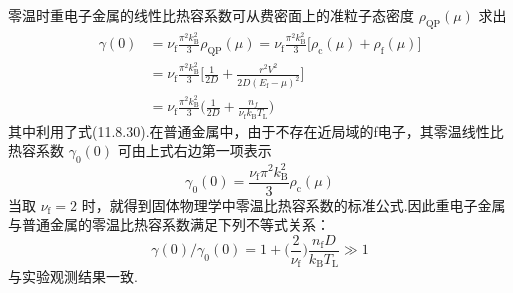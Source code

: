 零温时重电子金属的线性比热容系数可从费密面上的准粒子态密度 $\rho_{\mathrm{QP}}(\mu)$ 求出
\begin{equation}
\begin{aligned}
  \gamma(0)&=\nu_{\mathrm{f}}\frac{\pi^{2}k_{\mathrm{B}}^{2}}{3}\rho_{\mathrm{QP}}(\mu)
  =\nu_{\mathrm{f}}\frac{\pi^{2}k_{\mathrm{B}}^{2}}{3}\bigl[\rho_{\mathrm{c}}(\mu)+\rho_{\mathrm{f}}(\mu)\bigr]\\
  &=\nu_{\mathrm{f}}\frac{\pi^{2}k_{\mathrm{B}}^{2}}{3}\biggl[\frac{1}{2D}+\frac{r^{2}V^{2}}{2D(E_{\mathrm{f}}-\mu)^{2}}\biggr]\\
  &=\nu_{\mathrm{f}}\frac{\pi^{2}k_{\mathrm{B}}^{2}}{3}\biggl(\frac{1}{2D}+\frac{n_{f}}{\nu_{\mathrm{f}}k_{\mathrm{B}}T_{\mathrm{L}}}\biggr)
\end{aligned}
\end{equation}
其中利用了式(11.8.30).在普通金属中，由于不存在近局域的f电子，其零温线性比热容系数 $\gamma_{0}(0)$ 可由上式右边第一项表示
\begin{equation}
  \gamma_{0}(0)=\frac{\nu_{\mathrm{f}}\pi^{2}k_{\mathrm{B}}^{2}}{3}\rho_{\mathrm{c}}(\mu)
\end{equation}
当取 $\nu_{\mathrm{f}}=2$ 时，就得到固体物理学中零温比热容系数的标准公式.因此重电子金属与普通金属的零温比热容系数满足下列不等式关系：
\begin{equation}
  \gamma(0)/\gamma_{0}(0)=1+\biggl(\frac{2}{\nu_{\mathrm{f}}}\biggr)\frac{n_{\mathrm{f}}D}{k_{\mathrm{B}}T_{\mathrm{L}}}\gg 1
\end{equation}
与实验观测结果一致.

